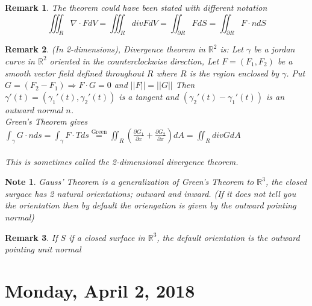 \documentclass[12pt]{article}
\theoremstyle{plain}
\newtheorem*{remark}{Remark}
\newtheorem*{note}{Note}
\theoremstyle{definition}
\begin{document}
\begin{remark}
	The theorem could have been stated with different notation
	$$\iiint_R \nabla \cdot F dV = \iiint_R div F dV = \iint_{\partial R} F dS = \iint_{\partial R} F\cdot n dS$$
\end{remark}

\begin{remark}
	(In 2-dimensions), Divergence theorem in $\mathbb{R}^2$ is: Let $\gamma$ be a jordan curve in $\mathbb{R}^2$ oriented in the counterclockwise direction, Let $F = (F_1, F_2)$ be a smooth vector field defined throughout $R$ where $R$ is the region enclosed by $\gamma$. Put $G=(F_2 -F_1) \Longrightarrow F \cdot G = 0$ and $||F||=||G||$ Then $\gamma '(t) = (\gamma_1 '(t), \gamma_2 '(t))$ is a tangent and $(\gamma_2 '(t)-\gamma_1 '(t))$ is an outward normal $n$.\\
	Green's Theorem gives $\int_\gamma G \cdot n ds = \int_\gamma F \cdot T ds \overset{\text{Green}}{=} \iint_R (\frac{\partial G_1}{\partial x} + \frac{\partial G_2}{\partial x})dA = \iint_R div G dA$\\
	\\
	This is sometimes called the 2-dimensional divergence theorem.
\end{remark}

\begin{note}
	Gauss' Theorem is a generalization of Green's Theorem to $\mathbb{R}^3$, the closed surgace has 2 natural orientations; outward and inward. (If it does not tell you the orientation then by default the oriengation is given by the outward pointing normal)
\end{note}

\begin{remark}
	If $S$ if a closed surface in $\mathbb{R}^3$, the default orientation is the outward pointing unit normal
\end{remark}

\newpage

\section{Monday, April 2, 2018}
\end{document}
